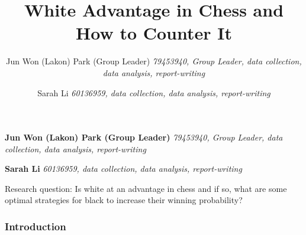 \documentclass[11pt,]{article}
\title{White Advantage in Chess and How to Counter It  }
\author{\Large Jun Won (Lakon) Park (Group
Leader)\vspace{0.05in} \newline\normalsize\emph{79453940, Group Leader,
data collection, data analysis, report-writing}   \and \Large Sarah
Li\vspace{0.05in} \newline\normalsize\emph{60136959, data collection,
data analysis, report-writing}  }
\date{}
\newcommand*{\authorfont}{\fontfamily{phv}\selectfont}
\renewenvironment{abstract}
 {{%
    \setlength{\leftmargin}{0mm}
    \setlength{\rightmargin}{\leftmargin}%
  }%
  \relax}
 {\endlist}
\begin{document}
	
%    


{%
\setlength{\parindent}{0pt}
\thispagestyle{plain}
{\fontsize{18}{20}\selectfont\raggedright 
\maketitle  %

}

{
   \vskip 13.5pt\relax \normalsize\fontsize{11}{12} 
\textbf{\authorfont Jun Won (Lakon) Park (Group
Leader)} \hskip 15pt \emph{\small 79453940, Group Leader, data
collection, data analysis,
report-writing}   \par \textbf{\authorfont Sarah
Li} \hskip 15pt \emph{\small 60136959, data collection, data analysis,
report-writing}   

}

}








\begin{abstract}

    \hbox{\vrule height .2pt width 39.14pc}

    \vskip 8.5pt %

\noindent Research question: Is white at an advantage in chess and if
so, what are some optimal strategies for black to increase their winning
probability?


    \hbox{\vrule height .2pt width 39.14pc}


\end{abstract}


\vskip -8.5pt



\noindent  

\hypertarget{introduction}{%
\subsubsection{Introduction}\label{introduction}}
\end{document}
